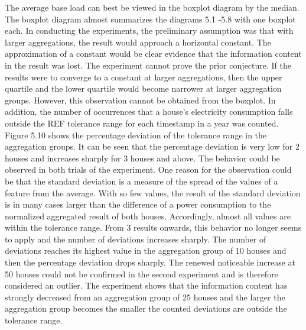 The average base load can best be viewed in the boxplot diagram by the median. The boxplot diagram almost summarizes the diagrams 5.1 -5.8 with one boxplot each. In conducting the experiments, the preliminary assumption was that with larger aggregations, the result would approach a horizontal constant. The approximation of a constant would be clear evidence that the information content in the result was lost. The experiment cannot prove the prior conjecture. If the results were to converge to a constant at larger aggregations, then the upper quartile and the lower quartile would become narrower at larger aggregation groups. However, this observation cannot be obtained from the boxplot. 
In addition, the number of occurrences that a house's electricity consumption falls outside the REF tolerance range for each timestamp in a year was counted. Figure 5.10 shows the percentage deviation of the tolerance range in the aggregation groups. It can be seen that the percentage deviation is very low for 2 houses and increases sharply for 3 houses and above. The behavior could be observed in both trials of the experiment. One reason for the observation could be that the standard deviation is a measure of the spread of the values of a feature from the average. With so few values, the result of the standard deviation is in many cases larger than the difference of a power consumption to the normalized aggregated result of both houses. Accordingly, almost all values are within the tolerance range. From 3 results onwards, this behavior no longer seems to apply and the number of deviations increases sharply. The number of deviations reaches its highest value in the aggregation group of 10 houses and then the percentage deviation drops sharply. The renewed noticeable increase at 50 houses could not be confirmed in the second experiment and is therefore considered an outlier. The experiment shows that the information content has strongly decreased from an aggregation group of 25 houses and the larger the aggregation group becomes the smaller the counted deviations are outside the tolerance range.
